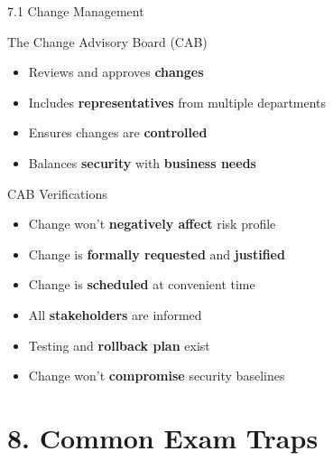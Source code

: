 \documentclass{beamer}
\begin{document}
	\begin{frame}{7.1 Change Management}
		\begin{block}{The Change Advisory Board (CAB)}
			\begin{itemize}
				\item Reviews and approves \textbf{changes}
				\item Includes \textbf{representatives} from multiple departments
				\item Ensures changes are \textbf{controlled}
				\item Balances \textbf{security} with \textbf{business needs}
			\end{itemize}
		\end{block}
		
		\begin{block}{CAB Verifications}
			\begin{itemize}
				\item Change won't \textbf{negatively affect} risk profile
				\item Change is \textbf{formally requested} and \textbf{justified}
				\item Change is \textbf{scheduled} at convenient time
				\item All \textbf{stakeholders} are informed
				\item Testing and \textbf{rollback plan} exist
				\item Change won't \textbf{compromise} security baselines
			\end{itemize}
		\end{block}
	\end{frame}
	
	\section{8. Common Exam Traps}
	
\end{document}
